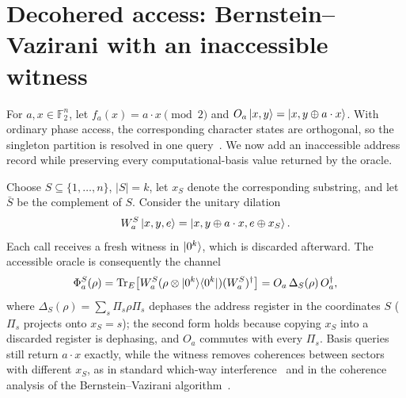 \documentclass[
  aps,
  pra,
  reprint,
  nofootinbib
]{revtex4-2}
\begin{document}
\section{Decohered access: Bernstein--Vazirani with an inaccessible witness}
\label{sec:witness}

For \(a,x\in\mathbb F_2^n\), let \(f_a(x)=a\cdot x \pmod2\) and
\(O_a\ket{x,y}=\ket{x,y\oplus a\cdot x}\). With ordinary phase access, the
corresponding character states are orthogonal, so the singleton partition is
resolved in one query~\cite{be-va}. We now add an inaccessible address record
while preserving every computational-basis value returned by the oracle.

Choose \(S\subseteq\{1,\ldots,n\}\), \(|S|=k\), let \(x_S\) denote the
corresponding substring, and let \(\bar S\) be the complement of \(S\).
Consider the unitary dilation
\begin{equation}
 W_a^S\ket{x,y,e}
 =\ket{x,y\oplus a\cdot x,e\oplus x_S}.
 \label{eq:witness-unitary}
\end{equation}
Each call receives a fresh witness in \(\ket{0^k}\), which is discarded
afterward. The accessible oracle is consequently the channel
\begin{equation}
 \Phi_a^S(\rho)=\operatorname{Tr}_E\!\left[
 W_a^S(\rho\otimes\ket{0^k}\!\bra{0^k})(W_a^S)^\dagger
 \right]
 =O_a\,\Delta_S(\rho)\,O_a^\dagger ,
 \label{eq:witness-channel}
\end{equation}
where \(\Delta_S(\rho)=\sum_s\Pi_s\rho\Pi_s\) dephases the address register in
the coordinates \(S\) (\(\Pi_s\) projects onto \(x_S=s\)); the second form
holds because copying \(x_S\) into a discarded register is dephasing, and
\(O_a\) commutes with every \(\Pi_s\). Basis queries still return \(a\cdot x\)
exactly, while the witness removes coherences between sectors with different
\(x_S\), as in standard which-way interference~\cite{Englert1996} and in the
coherence analysis of the Bernstein--Vazirani
algorithm~\cite{NaseriEtAl2022}.
\end{document}
